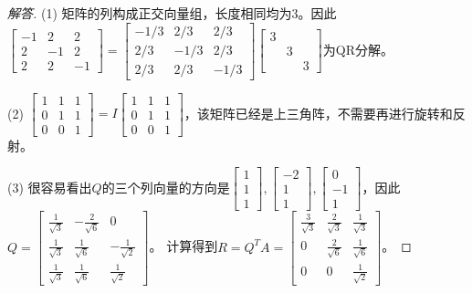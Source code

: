 \documentclass[UTF8]{ctexart}
\begin{document}
\begin{proof}[解答]
(1) 矩阵的列构成正交向量组，长度相同均为$3$。因此$\begin{bmatrix}-1&2&2\\2&-1&2\\2&2&-1\end{bmatrix}= \begin{bmatrix}-1/3&2/3&2/3\\2/3&-1/3&2/3\\2/3&2/3&-1/3\end{bmatrix}\begin{bmatrix}3 & &\\&3&\\&&3\end{bmatrix}$为QR分解。


(2) $\begin{bmatrix}1&1&1\\0&1&1\\0&0&1\end{bmatrix}=I\begin{bmatrix}1&1&1\\0&1&1\\0&0&1\end{bmatrix}$，该矩阵已经是上三角阵，不需要再进行旋转和反射。

(3) 很容易看出$Q$的三个列向量的方向是$\begin{bmatrix}1\\1\\1\end{bmatrix},\begin{bmatrix}-2\\1\\1\end{bmatrix},\begin{bmatrix}0\\-1\\1\end{bmatrix}$，因此$Q=\begin{bmatrix}\frac{1}{\sqrt{3}}&-\frac{2}{\sqrt{6}}&0\\\frac{1}{\sqrt{3}}&\frac{1}{\sqrt{6}}&-\frac{1}{\sqrt{2}}\\\frac{1}{\sqrt{3}}&\frac{1}{\sqrt{6}}&\frac{1}{\sqrt{2}}\end{bmatrix}$。 计算得到$R=Q^TA=\begin{bmatrix}\frac{3}{\sqrt{3}}&\frac{2}{\sqrt{3}}&\frac{1}{\sqrt{3}}\\0&\frac{2}{\sqrt{6}}&\frac{1}{\sqrt{6}}\\0&0&\frac{1}{\sqrt{2}}\end{bmatrix}$。


\end{proof}
\end{document}
